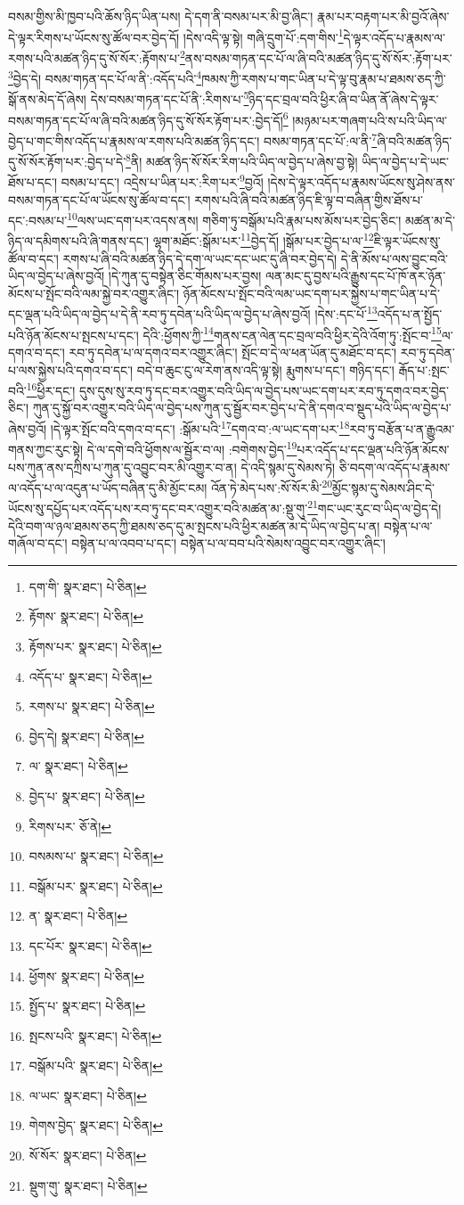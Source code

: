 བསམ་གྱིས་མི་ཁྱབ་པའི་ཆོས་ཉིད་ཡིན་པས། དེ་དག་ནི་བསམ་པར་མི་བྱ་ཞིང་། རྣམ་པར་བརྟག་པར་མི་བྱའོ་ཞེས་དེ་ལྟར་རིགས་པ་ཡོངས་སུ་ཚོལ་བར་བྱེད་དོ། །དེས་འདི་ལྟ་སྟེ། གཞི་དྲུག་པོ་:དག་གིས་\footnote{དག་གི་  སྣར་ཐང་།  པེ་ཅིན། }དེ་ལྟར་འདོད་པ་རྣམས་ལ་རགས་པའི་མཚན་ཉིད་དུ་སོ་སོར་:རྟོགས་པ་\footnote{རྟོགས་  སྣར་ཐང་།  པེ་ཅིན། }ནས་བསམ་གཏན་དང་པོ་ལ་ཞི་བའི་མཚན་ཉིད་དུ་སོ་སོར་:རྟོག་པར་\footnote{རྟོགས་པར་  སྣར་ཐང་།  པེ་ཅིན། }བྱེད་དེ། བསམ་གཏན་དང་པོ་ལ་ནི་:འདོད་པའི་\footnote{འདོད་པ་  སྣར་ཐང་།  པེ་ཅིན། }ཁམས་ཀྱི་རགས་པ་གང་ཡིན་པ་དེ་ལྟ་བུ་རྣམ་པ་ཐམས་ཅད་ཀྱི་སྒོ་ནས་མེད་དོ་ཞེས། དེས་བསམ་གཏན་དང་པོ་ནི་:རིགས་པ་\footnote{རགས་པ་  སྣར་ཐང་།  པེ་ཅིན། }ཉིད་དང་བྲལ་བའི་ཕྱིར་ཞི་བ་ཡིན་ནོ་ཞེས་དེ་ལྟར་བསམ་གཏན་དང་པོ་ལ་ཞི་བའི་མཚན་ཉིད་དུ་སོ་སོར་རྟོག་པར་:བྱེད་དོ།\footnote{བྱེད་དེ།  སྣར་ཐང་།  པེ་ཅིན། } །མཉམ་པར་གཞག་པའི་ས་པའི་ཡིད་ལ་བྱེད་པ་གང་གིས་འདོད་པ་རྣམས་ལ་རགས་པའི་མཚན་ཉིད་དང་། བསམ་གཏན་དང་པོ་:ལ་ནི་\footnote{ལ་  སྣར་ཐང་།  པེ་ཅིན། }ཞི་བའི་མཚན་ཉིད་དུ་སོ་སོར་རྟོག་པར་:བྱེད་པ་དེ་\footnote{བྱེད་པ་  སྣར་ཐང་།  པེ་ཅིན། }ནི། མཚན་ཉིད་སོ་སོར་རིག་པའི་ཡིད་ལ་བྱེད་པ་ཞེས་བྱ་སྟེ། ཡིད་ལ་བྱེད་པ་དེ་ཡང་ཐོས་པ་དང་། བསམ་པ་དང་། འདྲེས་པ་ཡིན་པར་:རིག་པར་\footnote{རིགས་པར་  ཅོ་ནེ། }བྱའོ། །དེས་དེ་ལྟར་འདོད་པ་རྣམས་ཡོངས་སུ་ཤེས་ནས་བསམ་གཏན་དང་པོ་ལ་ཡོངས་སུ་ཚོལ་བ་དང་། རགས་པའི་ཞི་བའི་མཚན་ཉིད་ཇི་ལྟ་བ་བཞིན་གྱིས་ཐོས་པ་དང་:བསམ་པ་\footnote{བསམས་པ་  སྣར་ཐང་།  པེ་ཅིན། }ལས་ཡང་དག་པར་འདས་ནས། གཅིག་ཏུ་བསྒོམ་པའི་རྣམ་པས་མོས་པར་བྱེད་ཅིང་། མཚན་མ་དེ་ཉིད་ལ་དམིགས་པའི་ཞི་གནས་དང་། ལྷག་མཐོང་:སྒོམ་པར་\footnote{བསྒོམ་པར་  སྣར་ཐང་།  པེ་ཅིན། }བྱེད་དོ། །སྒོམ་པར་བྱེད་པ་ལ་\footnote{ན་  སྣར་ཐང་།  པེ་ཅིན། }ཇི་ལྟར་ཡོངས་སུ་ཚོལ་བ་དང་། རགས་པ་ཞི་བའི་མཚན་ཉིད་དེ་དག་ལ་ཡང་དང་ཡང་དུ་ཞི་བར་བྱེད་དེ། དེ་ནི་མོས་པ་ལས་བྱུང་བའི་ཡིད་ལ་བྱེད་པ་ཞེས་བྱའོ། །དེ་ཀུན་དུ་བསྟེན་ཅིང་གོམས་པར་བྱས། ལན་མང་དུ་བྱས་པའི་རྒྱུས་དང་པོ་ཁོ་ནར་ཉོན་མོངས་པ་སྤོང་བའི་ལམ་སྐྱེ་བར་འགྱུར་ཞིང་། ཉོན་མོངས་པ་སྤོང་བའི་ལམ་ཡང་དག་པར་སྐྱེས་པ་གང་ཡིན་པ་དེ་དང་ལྡན་པའི་ཡིད་ལ་བྱེད་པ་དེ་ནི་རབ་ཏུ་དབེན་པའི་ཡིད་ལ་བྱེད་པ་ཞེས་བྱའོ། །དེས་:དང་པོ་\footnote{དང་པོར་  སྣར་ཐང་།  པེ་ཅིན། }འདོད་པ་ན་སྤྱོད་པའི་ཉོན་མོངས་པ་སྤངས་པ་དང་། དེའི་:ཕྱོགས་ཀྱི་\footnote{ཕྱོགས་  སྣར་ཐང་།  པེ་ཅིན། }གནས་ངན་ལེན་དང་བྲལ་བའི་ཕྱིར་དེའི་འོག་ཏུ་:སྤོང་བ་\footnote{སྤྱོད་པ་  སྣར་ཐང་།  པེ་ཅིན། }ལ་དགའ་བ་དང་། རབ་ཏུ་དབེན་པ་ལ་དགའ་བར་འགྱུར་ཞིང་། སྤོང་བ་དེ་ལ་ཕན་ཡོན་དུ་མཐོང་བ་དང་། རབ་ཏུ་དབེན་པ་ལས་སྐྱེས་པའི་དགའ་བ་དང་། བདེ་བ་ཆུང་ངུ་ལ་རེག་ནས་འདི་ལྟ་སྟེ། རྨུགས་པ་དང་། གཉིད་དང་། རྒོད་པ་:སྤང་བའི་\footnote{སྤངས་པའི་  སྣར་ཐང་།  པེ་ཅིན། }ཕྱིར་དང་། དུས་དུས་སུ་རབ་ཏུ་དང་བར་འགྱུར་བའི་ཡིད་ལ་བྱེད་པས་ཡང་དག་པར་རབ་ཏུ་དགའ་བར་བྱེད་ཅིང་། ཀུན་དུ་སྐྱོ་བར་འགྱུར་བའི་ཡིད་ལ་བྱེད་པས་ཀུན་དུ་སྦྱོར་བར་བྱེད་པ་དེ་ནི་དགའ་བ་སྡུད་པའི་ཡིད་ལ་བྱེད་པ་ཞེས་བྱའོ། །དེ་ལྟར་སྤོང་བའི་དགའ་བ་དང་། :སྒོམ་པའི་\footnote{བསྒོམ་པའི་  སྣར་ཐང་།  པེ་ཅིན། }དགའ་བ་:ལ་ཡང་དག་པར་\footnote{ལ་ཡང་  སྣར་ཐང་།  པེ་ཅིན། }རབ་ཏུ་བརྩོན་པ་ན་རྒྱུའམ་གནས་ཀྱང་རུང་སྟེ། དེ་ལ་དགེ་བའི་ཕྱོགས་ལ་སྦྱོར་བ་ལ། :བགེགས་བྱེད་\footnote{གེགས་བྱེད་  སྣར་ཐང་།  པེ་ཅིན། }པར་འདོད་པ་དང་ལྡན་པའི་ཉོན་མོངས་པས་ཀུན་ནས་དཀྲིས་པ་ཀུན་དུ་འབྱུང་བར་མི་འགྱུར་བ་ན། དེ་འདི་སྙམ་དུ་སེམས་ཏེ། ཅི་བདག་ལ་འདོད་པ་རྣམས་ལ་འདོད་པ་ལ་འདུན་པ་ཡོད་བཞིན་དུ་མི་མྱོང་ངམ། འོན་ཏེ་མེད་པས་:སོ་སོར་མི་\footnote{སོ་སོར་  སྣར་ཐང་།  པེ་ཅིན། }མྱོང་སྙམ་དུ་སེམས་ཤིང་དེ་ཡོངས་སུ་དཔྱོད་པར་འདོད་པས་རབ་ཏུ་དང་བར་འགྱུར་བའི་མཚན་མ་:སྡུ་གུ་\footnote{སྡུག་གུ་  སྣར་ཐང་།  པེ་ཅིན། }གང་ཡང་རུང་བ་ཡིད་ལ་བྱེད་དེ། དེའི་བག་ལ་ཉལ་ཐམས་ཅད་ཀྱི་ཐམས་ཅད་དུ་མ་སྤངས་པའི་ཕྱིར་མཚན་མ་དེ་ཡིད་ལ་བྱེད་པ་ན། བསྟེན་པ་ལ་གཞོལ་བ་དང་། བསྟེན་པ་ལ་འབབ་པ་དང་། བསྟེན་པ་ལ་བབ་པའི་སེམས་འབྱུང་བར་འགྱུར་ཞིང་། 
